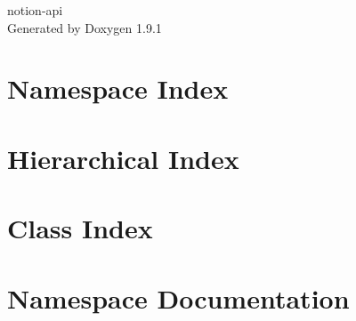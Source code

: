 \let\mypdfximage\pdfximage\def\pdfximage{\immediate\mypdfximage}\documentclass[twoside]{book}
\newcommand{\+}{\discretionary{\mbox{\scriptsize$\hookleftarrow$}}{}{}}
\newcommand{\clearemptydoublepage}{%
  \newpage{\pagestyle{empty}\cleardoublepage}%
}
\begin{document}
\raggedbottom

\hypersetup{pageanchor=false,
             bookmarksnumbered=true,
             pdfencoding=unicode
            }
\begin{titlepage}
\vspace*{7cm}
\begin{center}%
{\Large notion-\/api }\\
\vspace*{1cm}
{\large Generated by Doxygen 1.9.1}\\
\end{center}
\end{titlepage}
\clearemptydoublepage
{}
\tableofcontents
\clearemptydoublepage
{}
\hypersetup{pageanchor=true}

\chapter{Namespace Index}

\chapter{Hierarchical Index}

\chapter{Class Index}

\chapter{Namespace Documentation}




















\end{document}
